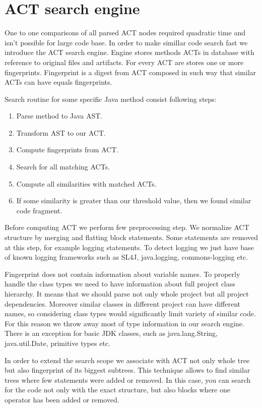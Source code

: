 \section{ACT search engine}

One to one comparisons of all parsed ACT nodes required quadratic time and isn't possible for large code base.
In order to make simillar code search fast we introduce the ACT search engine.
Engine stores methods ACTs in database with reference to original files and artifacts.
For every ACT are stores one or more fingerprints.
Fingerprint is a digest from ACT composed in such way that similar ACTs can have equals fingerprints.

Search routine for some specific Java method consist following steps:
\begin{enumerate} \itemsep0pt \parskip0pt 
  \item Parse method to Java AST.
  \item Transform AST to our ACT.
  \item Compute fingerprints from ACT.
  \item Search for all matching ACTs.
  \item Compute all similarities with matched ACTs.
  \item If some similarity is greater than our threshold value, then we found similar code fragment.
\end{enumerate}

Before computing ACT we perform few preprocessing step.
We normalize ACT structure by merging and flatting block statements.
Some statements are removed at this step, for example logging statements.
To detect logging we just have base of known logging frameworks such as SL4J, java.logging, commons-logging etc.

Fingerprint does not contain information about variable names.
To properly handle the class types we need to have information about full project class hierarchy.
It means that we should parse not only whole project but all project dependencies.
Moreover similar classes in different project can have different names, so considering class types would significantly limit variety of similar code. 
For this reason we throw away most of type information in our search engine.
There is an exception for basic JDK classes, such as java.lang.String, java.util.Date, primitive types etc.


In order to extend the search scope we associate with ACT not only whole tree but also fingerprint of its biggest
subtrees.
This technique allows to find similar trees where few statements were added or removed.
In this case, you can search for the code not only with the exact structure, but also blocks where one operator has been added or removed.
